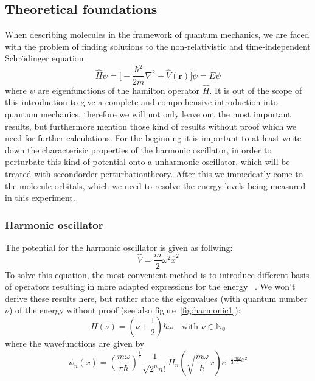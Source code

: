 \subsection{Theoretical foundations}
When describing molecules in the framework of quantum mechanics, we are faced with the problem of 
finding solutions to the non-relativistic and time-independent Schrödinger equation
\begin{equation}
    \hat{H} \psi = \Big[- \frac{\hbar^2}{2m} 
        \nabla^2 + \hat{V}(\mathbf{r}) \Big] \psi = E \psi
\end{equation}
where $\psi$ are eigenfunctions of the hamilton operator $\hat{H}$.
It is out of the scope of this introduction to give a complete
and comprehensive introduction into quantum mechanics, therefore
we will not only leave out the most important results, but
furthermore mention those kind of results without proof which
we need for further calculations. For the beginning it is
important to at least write down the characterisic properties
of the harmonic oscillator, in order to perturbate this
kind of potential onto a unharmonic oscillator, which will be
treated with secondorder perturbationtheory. After this we 
immedeatly come to the molecule orbitals, which we need
to resolve the energy levels being measured in this experiment.

\subsubsection{Harmonic oscillator}
The potential for the harmonic oscillator is given as follwing:
\begin{equation}
    \hat{V}= \frac{m}{2} \omega^2 \hat{x}^2
\end{equation}
To solve this equation, the most convenient method is to
introduce different basis of operators resulting in more 
adapted expressions for the energy
~\cite{fliessbach2008quantenmechanik}. We won't derive 
these results here, but rather state the eigenvalues 
(with quantum number $\nu$)
of the energy without proof
(see also figure~\ref{fig:harmonic1}):
\begin{equation}
    H(\nu) = \left ( \nu + \frac{1}{2} \right )\hbar \omega 
    \quad \text{with $\nu\in \mathbb{N_0}$}
\end{equation}
where the wavefunctions are given by
\begin{equation}
    \psi_n(x)= \left(\frac{m\omega}{\pi\hbar}
    \right)^\frac{1}{4}
    \frac{1}{\sqrt{2^nn!}} H_n
    \left(\sqrt{\frac{m\omega}{\hbar}} x \right)
    e^{-\frac{1}{2}\frac{m\omega}{\hbar}x^2}
\end{equation}

